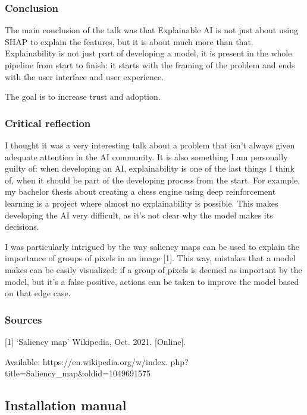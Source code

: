 \documentclass{article}
\begin{document}
\subsubsection{Conclusion}

The main conclusion of the talk was that Explainable AI is not just about using SHAP to explain
the features, but it is about much more than that.
Explainability is not just part of developing a model, 
it is present in the whole pipeline from start to finish: it starts with the framing of the problem
and ends with the user interface and user experience.

The goal is to increase trust and adoption.

\subsubsection{Critical reflection}

I thought it was a very interesting talk about a problem that isn't always given adequate 
attention in the AI community. It is also something I am personally guilty of: when developing
an AI, explainability is one of the last things I think of, when it should be part of the 
developing process from the start. For example, my bachelor thesis about creating a chess engine using deep reinforcement learning
is a project where almost no explainability is possible. This makes developing the AI 
very difficult, as it's not clear why the model makes its decisions. 

I was particularly intrigued by the way saliency maps can be used to explain the importance
of groups of pixels in an image [1]. This way, mistakes that a model makes can be easily visualized:
if a group of pixels is deemed as important by the model, but it's a false positive, actions can 
be taken to improve the model based on that edge case.


\subsubsection{Sources}

[1] `Saliency map' Wikipedia, Oct. 2021. [Online]. 

Available: https://en.wikipedia.org/w/index.
php?title=Saliency\_map\&oldid=1049691575

\newpage
\subsection{Installation manual}
\end{document}
